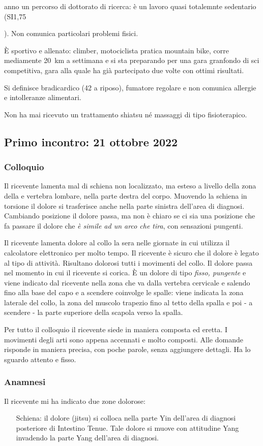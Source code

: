 \documentclass[12pt, openright, twoside]{report}
\newcommand{\RNum}[1]{\uppercase\expandafter{\romannumeral #1\relax}}
\begin{document}
anno un percorso di dottorato di ricerca: è un lavoro quasi totalemnte sedentario (SI{1,75}{\hours\per\week).
Non comunica particolari problemi fisici.

\`{E} sportivo e allenato: climber, motociclista pratica mountain bike, corre
mediamente \SI{20}{\kilo\metre} a settimana e si sta preparando per una gara
granfondo di sci competitiva, gara alla quale ha già partecipato due volte con
ottimi risultati.

Si definisce bradicardico (\SI{42}{\bpm} a riposo), fumatore regolare
e non comunica allergie e intolleranze alimentari.

Non ha mai ricevuto un trattamento shiatsu né massaggi di tipo fisioterapico.
\subsection*{Primo incontro: 21 ottobre 2022}
\subsubsection{Colloquio}
Il ricevente lamenta mal di schiena non localizzato, ma esteso a livello della
zona della \RNum{1} e \RNum{2} vertebra lombare, nella parte destra del corpo.
Muovendo la schiena in torsione il dolore si trasferisce anche nella parte
sinistra dell'area di diagnosi.
Cambiando posizione il dolore passa, ma non è chiaro se ci sia una posizione che
fa passare il dolore che \textit{è simile ad un arco che tira}, con sensazioni
pungenti.

Il ricevente lamenta dolore al collo la sera nelle giornate in cui utilizza il
calcolatore elettronico per molto tempo.
Il ricevente è sicuro che il dolore è legato al tipo di attività.
Risultano dolorosi tutti i movimenti del collo.
Il dolore passa nel momento in cui il ricevente si corica.
\`{E} un dolore di tipo \textit{fisso, pungente} e viene indicato dal ricevente
nella zona che va dalla \RNum{7} vertebra cervicale e salendo fino alla base del
capo e a scendere coinvolge le spalle: viene indicata la zona laterale del
collo, la zona del muscolo trapezio fino al tetto della spalla e poi - a
scendere - la parte superiore della scapola verso la spalla.

Per tutto il colloquio il ricevente siede in maniera composta ed eretta.
I movimenti degli arti sono appena accennati e molto composti.
Alle domande risponde in maniera precisa, con poche parole, senza aggiungere
dettagli.
Ha lo sguardo attento e fisso.

\subsubsection*{Anamnesi}
Il ricevente mi ha indicato due zone dolorose:
\begin{itemize}[font=\bfseries, align=left]
\item[Schiena:] il dolore (jitsu) si colloca nella parte Yin dell’area di diagnosi posteriore di Intestino Tenue. Tale dolore si muove con attitudine Yang invadendo la parte Yang dell’area di diagnosi.


\end{itemize}}
\end{document}
